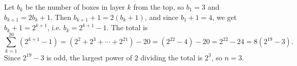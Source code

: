 Let $b_k$ be the number of boxes in layer $k$ from the top, so $b_1=3$ and $b_{k+1}=2b_k+1$. Then $b_{k+1}+1=2\left(b_k+1\right)$, and since $b_1+1=4$, we get $b_k+1=2^{k+1}$, i.e. $b_k=2^{k+1}-1$. The total is
\[\sum_{k=1}^{20}\left(2^{k+1}-1\right)=\left(2^2+2^3+\cdots+2^{21}\right)-20=\left(2^{22}-4\right)-20=2^{22}-24=8\left(2^{19}-3\right).\]
Since $2^{19}-3$ is odd, the largest power of $2$ dividing the total is $2^3$, so $n=\boxed{3}$.
